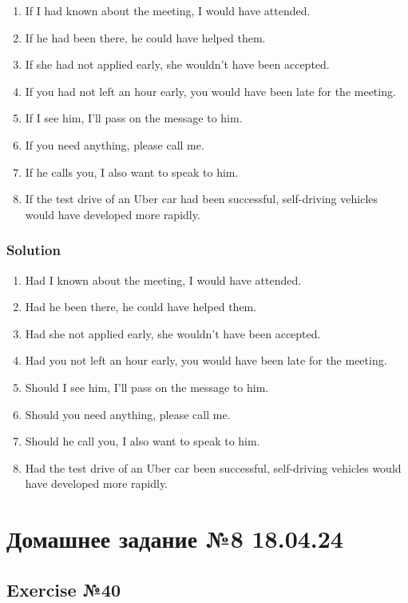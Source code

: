 \begin{enumerate}
      \item If I had known about the meeting, I would have attended.
      \item If he had been there, he could have helped them.
      \item If she had not applied early, she wouldn’t have been accepted.
      \item If you had not left an hour early, you would have been late for the meeting.
      \item If I see him, I’ll pass on the message to him.
      \item If you need anything, please call me.
      \item If he calls you, I also want to speak to him.
      \item If the test drive of an Uber car had been successful, self-driving vehicles would have developed more rapidly.
\end{enumerate}

\subsection*{Solution}
\begin{enumerate}
      \item Had I known about the meeting, I would have attended.
      \item Had he been there, he could have helped them.
      \item Had she not applied early, she wouldn’t have been accepted.
      \item Had you not left an hour early, you would have been late for the meeting.
      \item Should I see him, I’ll pass on the message to him.
      \item Should you need anything, please call me.
      \item Should he call you, I also want to speak to him.
      \item Had the test drive of an Uber car been successful, self-driving vehicles would have developed more rapidly.
\end{enumerate}

\chapter{Домашнее задание №8 18.04.24}

\section{Exercise №40}

